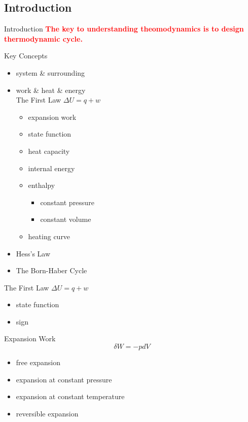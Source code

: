 \documentclass[12pt,compress]{beamer}
\begin{document}
\subsection{Introduction}
\begin{frame}{Introduction}
	\textbf{\textcolor{red}{\LARGE The key to understanding theomodynamics is to design thermodynamic cycle.}}
\end{frame}
\begin{frame}{Key Concepts}
	\begin{itemize}
		\item system \& surrounding
		\item work \& heat \& energy \\ 
			The First Law $\Delta U = q + w$
			\begin{itemize}
				\item expansion work
				\item state function
				\item heat capacity
				\item internal energy
				\item enthalpy
				\begin{itemize}
					\item constant pressure
					\item constant volume
				\end{itemize}
				\item heating curve
			\end{itemize}
		\item Hess's Law
		\item The Born-Haber Cycle
	\end{itemize}
\end{frame}
\begin{frame}{The First Law}
	$\Delta U = q + w$
	\begin{itemize}
		\item state function
		\item sign
	\end{itemize}
\end{frame}
\begin{frame}{Expansion Work}
	\begin{equation*}
		\delta W = -pdV
	\end{equation*}
	\begin{itemize}
		\item free expansion
		\item expansion at constant pressure
		\item expansion at constant temperature
		\item reversible expansion
	\end{itemize}
\end{frame}
\end{document}
